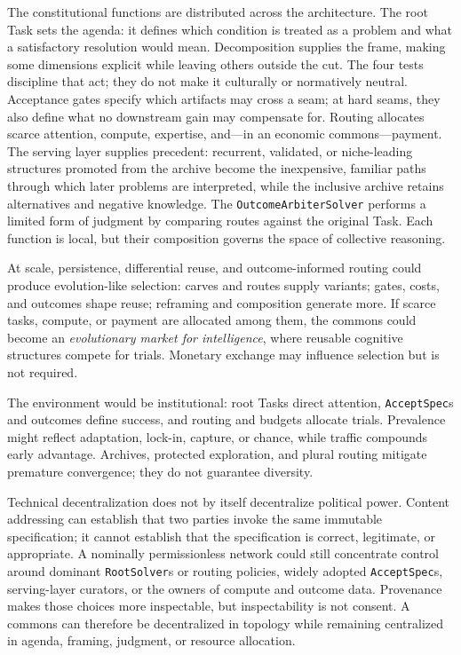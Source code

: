 \documentclass[11pt]{article}
\let\oldtexttt\texttt
\renewcommand{\texttt}[1]{\oldtexttt{\small #1}}
\begin{document}
The constitutional functions are distributed across the architecture. The root Task sets the agenda: it defines which condition is treated as a problem and what a satisfactory resolution would mean. Decomposition supplies the frame, making some dimensions explicit while leaving others outside the cut. The four tests discipline that act; they do not make it culturally or normatively neutral. Acceptance gates specify which artifacts may cross a seam; at hard seams, they also define what no downstream gain may compensate for. Routing allocates scarce attention, compute, expertise, and---in an economic commons---payment. The serving layer supplies precedent: recurrent, validated, or niche-leading structures promoted from the archive become the inexpensive, familiar paths through which later problems are interpreted, while the inclusive archive retains alternatives and negative knowledge. The \texttt{OutcomeArbiterSolver} performs a limited form of judgment by comparing routes against the original Task. Each function is local, but their composition governs the space of collective reasoning.

At scale, persistence, differential reuse, and outcome-informed routing could produce evolution-like selection: carves and routes supply variants; gates, costs, and outcomes shape reuse; reframing and composition generate more. If scarce tasks, compute, or payment are allocated among them, the commons could become an \emph{evolutionary market for intelligence}, where reusable cognitive structures compete for trials. Monetary exchange may influence selection but is not required.

The environment would be institutional: root Tasks direct attention, \texttt{AcceptSpec}s and outcomes define success, and routing and budgets allocate trials. Prevalence might reflect adaptation, lock-in, capture, or chance, while traffic compounds early advantage. Archives, protected exploration, and plural routing mitigate premature convergence; they do not guarantee diversity.

Technical decentralization does not by itself decentralize political power. Content addressing can establish that two parties invoke the same immutable specification; it cannot establish that the specification is correct, legitimate, or appropriate. A nominally permissionless network could still concentrate control around dominant \texttt{RootSolver}s or routing policies, widely adopted \texttt{AcceptSpec}s, serving-layer curators, or the owners of compute and outcome data. Provenance makes those choices more inspectable, but inspectability is not consent. A commons can therefore be decentralized in topology while remaining centralized in agenda, framing, judgment, or resource allocation.
\end{document}
